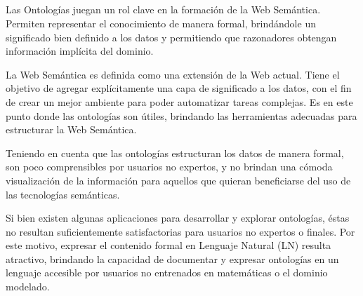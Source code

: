 \ \\
\ \\
\label{pagresum}
\\ \\
Las Ontologías juegan un rol clave en la formación de la Web Semántica. Permiten representar el conocimiento de manera formal, brindándole un significado bien definido a los datos y permitiendo que razonadores obtengan información implícita del dominio. 

La Web Semántica es definida como una extensión de la Web actual. Tiene el objetivo de agregar explícitamente una capa de significado a los datos, con el fin de crear un mejor ambiente para poder automatizar tareas complejas. Es en este punto donde las ontologías son útiles, brindando las herramientas adecuadas para estructurar la Web Semántica. 



Teniendo en cuenta que las ontologías estructuran los datos de manera formal, son poco comprensibles por usuarios no expertos, y no brindan una cómoda visualización de la información para aquellos que quieran beneficiarse del uso de las tecnologías semánticas.

Si bien existen algunas aplicaciones para desarrollar y explorar ontologías, éstas no resultan suficientemente satisfactorias para usuarios no expertos o finales. 
Por este motivo, expresar el contenido formal en Lenguaje Natural (LN) resulta atractivo, brindando la capacidad de documentar y expresar ontologías en un lenguaje accesible por usuarios no entrenados en matemáticas o el dominio modelado. 


